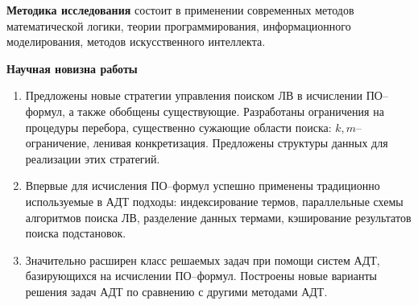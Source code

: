 \documentclass[a4paper]{report}
\begin{document}
\textbf{Методика исследования} состоит в применении современных методов математической логики, теории программирования, информационного моделирования, методов искусственного интеллекта.

\textbf{Научная новизна работы}

\begin{enumerate}
\item{}Предложены новые стратегии управления поиском ЛВ в исчислении ПО--формул, а также обобщены существующие. Разработаны ограничения на процедуры перебора, существенно сужающие области поиска: $k,m$--ог\-ра\-ни\-че\-ние, ленивая конкретизация. Предложены структуры данных для реализации этих стратегий.

\item{}Впервые для исчисления ПО--формул успешно применены традиционно используемые в АДТ подходы: индексирование термов, параллельные схемы алгоритмов поиска ЛВ, разделение данных термами, кэширование результатов поиска подстановок.

\item{}Значительно расширен класс решаемых задач при помощи систем АДТ, базирующихся на исчислении ПО--формул. Построены новые варианты решения задач АДТ по сравнению с другими методами АДТ.
\end{enumerate}
\end{document}
